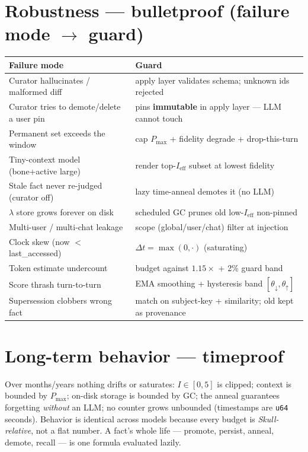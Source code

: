 \documentclass[11pt]{article}
\begin{document}
\section{Robustness — bulletproof (failure mode $\to$ guard)}
\begin{center}\small
\begin{tabular}{@{}p{7.2cm}p{7.4cm}@{}}
\toprule
\textbf{Failure mode} & \textbf{Guard}\\
\midrule
Curator hallucinates / malformed diff & apply layer validates schema; unknown ids rejected\\
Curator tries to demote/delete a user pin & pins \textbf{immutable} in apply layer — LLM cannot touch\\
Permanent set exceeds the window & cap $P_{\max}$ + fidelity degrade + drop-this-turn\\
Tiny-context model (bone+active large) & render top-$I_{\text{eff}}$ subset at lowest fidelity\\
Stale fact never re-judged (curator off) & lazy time-anneal demotes it (no LLM)\\
$\lambda$ store grows forever on disk & scheduled GC prunes old low-$I_{\text{eff}}$ non-pinned\\
Multi-user / multi-chat leakage & scope (global/user/chat) filter at injection\\
Clock skew (now $<$ last\_accessed) & $\Delta t=\max(0,\cdot)$ (saturating)\\
Token estimate undercount & budget against $1.15\times$ + 2\% guard band\\
Score thrash turn-to-turn & EMA smoothing + hysteresis band $[\theta_\downarrow,\theta_\uparrow]$\\
Supersession clobbers wrong fact & match on subject-key + similarity; old kept as provenance\\
\bottomrule
\end{tabular}
\end{center}

\section{Long-term behavior — timeproof}
Over months/years nothing drifts or saturates: $I\in[0,5]$ is clipped; context is bounded by $P_{\max}$; on-disk storage is bounded by GC; the anneal guarantees forgetting \emph{without} an LLM; no counter grows unbounded (timestamps are \texttt{u64} seconds). Behavior is identical across models because every budget is \emph{Skull-relative}, not a flat number. A fact's whole life — promote, persist, anneal, demote, recall — is one formula evaluated lazily.
\end{document}
